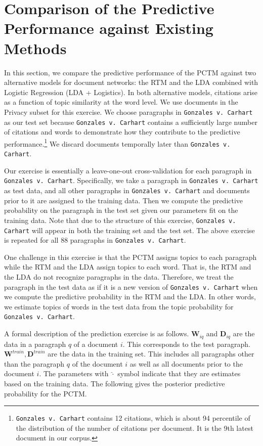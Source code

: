 \section{Comparison of the Predictive Performance against Existing Methods}
\label{sec:predict_prob}

In this section, we compare the predictive performance of the PCTM against two alternative models for document networks: the RTM and the LDA combined with Logistic Regression (LDA + Logistics).
In both alternative models, citations arise as a function of topic similarity at the word level. 
We use documents in the Privacy subset for this exercise. 
We choose paragraphs in \texttt{Gonzales v. Carhart} as our test set because \texttt{Gonzales v. Carhart} contains a sufficiently large number of citations and words to demonstrate how they contribute to the predictive performance.\footnote{\texttt{Gonzales v. Carhart} contains 12 citations, which is about 94 percentile of the distribution of the number of citations per document. It is the 9th latest document in our corpus.} 
We discard documents temporally later than \texttt{Gonzales v. Carhart}. 

Our exercise is essentially a leave-one-out cross-validation for each paragraph in \texttt{Gonzales v. Carhart}. 
Specifically, we take a paragraph in \texttt{Gonzales v. Carhart} as test data, and all other paragraphs in \texttt{Gonzales v. Carhart} and documents prior to it are assigned to the training data. 
Then we compute the predictive probability on the paragraph in the test set given our parameters fit on the training data. 
Note that due to the structure of this exercise, \texttt{Gonzales v. Carhart} will appear in both the training set and the test set. %
The above exercise is repeated for all 88 paragraphs in \texttt{Gonzales v. Carhart}. 

One challenge in this exercise is that the PCTM assigns topics to each paragraph while the RTM and the LDA assign topics to each word. 
That is, the RTM and the LDA do not recognize paragraphs in the data. 
Therefore, we treat the paragraph in the test data as if it is a new version of \texttt{Gonzales v. Carhart} when we compute the predictive probability in the RTM and the LDA.
In other words, we estimate topics of words in the test data from the topic probability for \texttt{Gonzales v. Carhart}. 

A formal description of the prediction exercise is as follows.
$\mathbf{W}_{iq}$ and $\mathbf{D}_{iq}$ are the data in a paragraph $q$ of a document $i$.
This corresponds to the test paragraph.
$\mathbf{W}^{train}, \mathbf{D}^{train}$ are the data in the training set.
This includes all paragraphs other than the paragraph $q$ of the document $i$ as well as all documents prior to the document $i$.
The parameters with $\hat{\cdot}$ symbol indicate that they are estimates based on the training data.
The following gives the posterior predictive probability for the PCTM.

